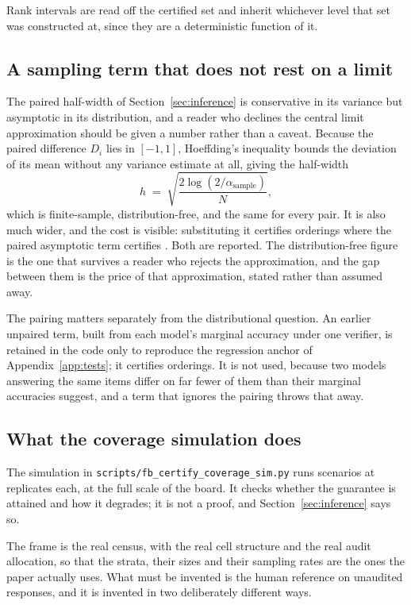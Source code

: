 Rank intervals are read off the certified set and inherit whichever level that set was
constructed at, since they are a deterministic function of it.

\subsection{A sampling term that does not rest on a limit}

The paired half-width of Section~\ref{sec:inference} is conservative in its variance but
asymptotic in its distribution, and a reader who declines the central limit approximation
should be given a number rather than a caveat. Because the paired difference $D_i$ lies in
$[-1, 1]$, Hoeffding's inequality bounds the deviation of its mean without any variance
estimate at all, giving the half-width
\[
h \;=\; \sqrt{\frac{2 \log(2/\alpha_{\mathrm{sample}})}{N}} ,
\]
which is finite-sample, distribution-free, and the same for every pair. It is also much
wider, and the cost is visible: substituting it certifies \CertHoeffding{} orderings where the
paired asymptotic term certifies \CertEpsZero{}. Both are reported. The distribution-free
figure is the one that survives a reader who rejects the approximation, and the gap between
them is the price of that approximation, stated rather than assumed away.

The pairing matters separately from the distributional question. An earlier unpaired term,
built from each model's marginal accuracy under one verifier, is retained in the code only to
reproduce the regression anchor of Appendix~\ref{app:tests}; it certifies
\CertSamplingLegacy{} orderings. It is not used, because two models answering the same items
differ on far fewer of them than their marginal accuracies suggest, and a term that ignores
the pairing throws that away.

\subsection{What the coverage simulation does}

The simulation in \texttt{scripts/fb\_certify\_coverage\_sim.py} runs \SimScenarios{}
scenarios at \SimReplicates{} replicates each, at the full scale of the board. It checks
whether the guarantee is attained and how it degrades; it is not a proof, and
Section~\ref{sec:inference} says so.

The frame is the real census, with the real cell structure and the real audit allocation, so
that the strata, their sizes and their sampling rates are the ones the paper actually uses.
What must be invented is the human reference on unaudited responses, and it is invented in two
deliberately different ways.


